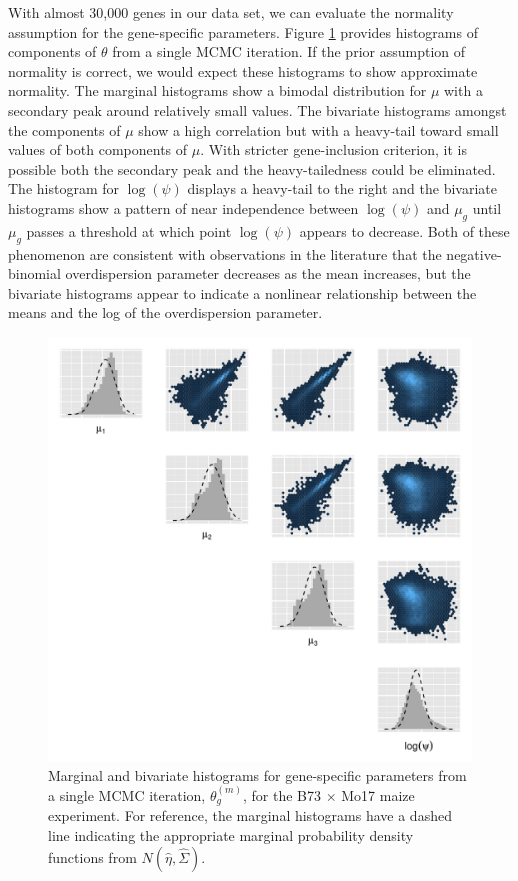 \documentclass[useAMS,usenatbib,referee]{biom}
\begin{document}
With almost 30,000 genes in our data set, we can evaluate the normality assumption for the gene-specific parameters. Figure \ref{f:normality} provides histograms of components of $\theta$ from a single MCMC iteration. If the prior assumption of normality is correct, we would expect these histograms to show approximate normality. The marginal histograms show a bimodal distribution for $\mu$ with a secondary peak around relatively small values. The bivariate histograms amongst the components of $\mu$ show a high correlation but with a heavy-tail toward small values of both components of $\mu$. With stricter gene-inclusion criterion, it is possible both the secondary peak and the heavy-tailedness could be eliminated. The histogram for $\log(\psi)$ displays a heavy-tail to the right and the bivariate histograms show a pattern of near independence between $\log(\psi)$ and $\mu_g$ until $\mu_g$ passes a threshold at which point $\log(\psi)$ appears to decrease. Both of these phenomenon are consistent with observations in the literature that the negative-binomial overdispersion parameter decreases as the mean increases, but the bivariate histograms appear to indicate a nonlinear relationship between the means and the log of the overdispersion parameter.

\begin{figure}
\centerline{\includegraphics[width=\textwidth]{normality}}
\caption{Marginal and bivariate histograms for gene-specific parameters from a single MCMC iteration, $\theta_g^{(m)}$,  for the B73 $\times$ Mo17 maize experiment. For reference, the marginal histograms have a dashed line indicating the appropriate marginal probability density functions from $N(\hat{\eta},\hat{\Sigma})$.}
\label{f:normality}
\end{figure}
\end{document}
